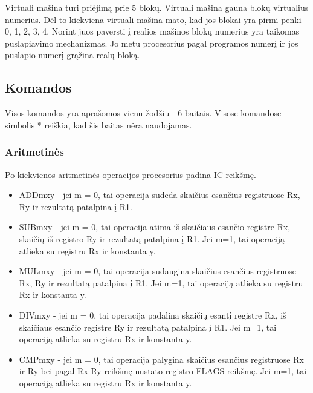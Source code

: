 \documentclass{VUMIFInfKursinis}
\begin{document}
Virtuali mašina turi priėjimą prie 5 blokų. Virtuali mašina gauna blokų virtualius numerius. Dėl to kiekviena virtuali mašina mato, kad jos blokai yra pirmi penki - 0, 1, 2, 3, 4. Norint juos paversti į realios mašinos blokų numerius yra taikomas puslapiavimo mechanizmas. Jo metu procesorius pagal programos numerį ir jos puslapio numerį grąžina realų bloką.

\subsection{Komandos}

Visos komandos yra aprašomos vienu žodžiu - 6 baitais. Visose komandose simbolis * reiškia, kad šis baitas nėra naudojamas.

\subsubsection{Aritmetinės}
Po kiekvienos aritmetinės operacijos procesorius padina IC reikšmę.
\begin{itemize}
	\item ADDmxy - jei m = 0, tai operacija sudeda skaičius esančius registruose Rx, Ry ir rezultatą patalpina į R1.
	\item SUBmxy - jei m = 0, tai operacija atima iš skaičiaus esančio registre Rx, skaičių iš registro Ry ir rezultatą patalpina į R1. Jei m=1, tai operaciją atlieka su registru Rx ir konstanta y.
	\item MULmxy - jei m = 0, tai operacija sudaugina skaičius esančius registruose Rx, Ry ir rezultatą patalpina į R1. Jei m=1, tai operaciją atlieka su registru Rx ir konstanta y.
	\item DIVmxy - jei m = 0, tai operacija padalina skaičių esantį registre Rx, iš skaičiaus esančio registre Ry ir rezultatą patalpina į R1. Jei m=1, tai operaciją atlieka su registru Rx ir konstanta y.
	\item CMPmxy - jei m = 0, tai operacija palygina skaičius esančius registruose Rx ir Ry bei pagal Rx-Ry reikšmę nustato registro FLAGS reikšmę. Jei m=1, tai operaciją atlieka su registru Rx ir konstanta y.
\end{itemize}
\end{document}
